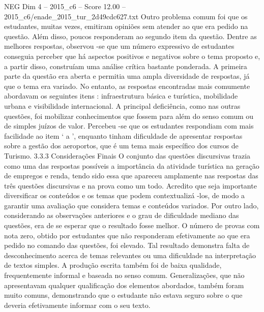 \begin{textsample}{NEG Dim 4 – 2015\_c6 – Score 12.00 – 2015\_c6/enade\_2015\_tur\_2d49cdc627.txt}
Outro problema comum foi que os estudantes, muitas vezes, emitiram opiniões sem atender ao que era pedido na questão.
Além disso, poucos responderam ao segundo item da questão.
Dentre as melhores respostas, observou -se que um número expressivo de estudantes conseguia perceber que há aspectos positivos e negativos sobre o tema proposto e, a partir disso, construíam uma análise crítica bastante ponderada.
A primeira parte da questão era aberta e permitia uma ampla diversidade de respostas, já que o tema era variado.
No entanto, as respostas encontradas mais comumente abordavam os seguintes itens : infraestrutura básica e turística, mobilidade urbana e visibilidade internacional.
A principal deficiência, como nas outras questões, foi mobilizar conhecimentos que fossem para além do senso comum ou de simples juízos de valor.
Percebeu -se que os estudantes respondiam com mais facilidade ao item ‘ a ’, enquanto tinham dificuldade de apresentar respostas sobre a gestão dos aeroportos, que é um tema mais específico dos cursos de Turismo. 3.3.3 Considerações Finais O conjunto das questões discursivas trazia como uma das respostas possíveis a importância da atividade turística na geração de empregos e renda, tendo sido essa que apareceu amplamente nas respostas das três questões discursivas e na prova como um todo.
Acredito que seja importante diversificar os conteúdos e os temas que podem contextualizá -los, de modo a garantir uma avaliação que considera temas e conteúdos variados.
Por outro lado, considerando as observações anteriores e o grau de dificuldade mediano das questões, era de se esperar que o resultado fosse melhor.
O número de provas com nota zero, obtido por estudantes que não responderam efetivamente ao que era pedido no comando das questões, foi elevado.
Tal resultado demonstra falta de desconhecimento acerca de temas relevantes ou uma dificuldade na interpretação de textos simples.
A produção escrita também foi de baixa qualidade, frequentemente informal e baseada no senso comum.
Generalizações, que não apresentavam qualquer qualificação dos elementos abordados, também foram muito comuns, demonstrando que o estudante não estava seguro sobre o que deveria efetivamente informar com o seu texto.

\end{textsample}
